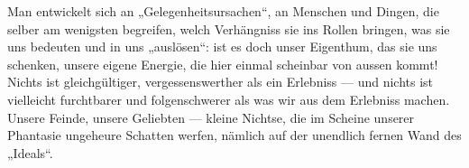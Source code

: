 Man entwickelt sich an „Gelegenheitsursachen“, an Menschen und Dingen, die selber am wenigsten begreifen, welch Verhängniss sie ins Rollen bringen, was sie uns bedeuten und in uns „auslösen“: ist es doch unser Eigenthum, das sie uns schenken, unsere eigene Energie, die hier einmal scheinbar von aussen kommt! Nichts ist gleichgültiger, vergessenswerther als ein Erlebniss — und nichts ist vielleicht furchtbarer und folgenschwerer als was wir aus dem Erlebniss machen. Unsere Feinde, unsere Geliebten — kleine Nichtse, die im Scheine unserer Phantasie ungeheure Schatten werfen, nämlich auf der unendlich fernen Wand des „Ideals“.
\par

